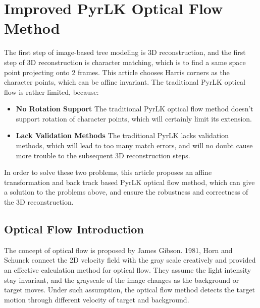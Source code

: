
\chapter{Improved PyrLK Optical Flow Method}
\label{cha:pyrlk}
The first step of image-based tree modeling is 3D reconstruction, and the first
step of 3D reconstruction is character matching, which is to find a same space 
point projecting onto 2 frames. This article chooses Harris corners as the character
points, which can be affine invariant. The traditional PyrLK optical flow is rather 
limited, because:\\

\begin{itemize}
	\item \textbf{No Rotation Support} The traditional PyrLK optical flow method doesn't support
		rotation of character points, which will certainly limit its extension.
	\item \textbf{Lack Validation Methods} The traditional PyrLK lacks validation methods, which will
		lead to too many match errors, and will no doubt cause more trouble to the subsequent 3D 
		reconstruction steps.
\end{itemize}

In order to solve these two problems, this article proposes an affine transformation and back track based
PyrLK optical flow method, which can give a solution to the problems above, and ensure the robustness and 
correctness of the 3D reconstruction.

%

\section{Optical Flow Introduction}
The concept of optical flow is proposed by James Gibson. 1981, Horn and Schunck connect the 
2D velocity field with the gray scale creatively and provided an effective calculation method
for optical flow\cite{horn}. They assume the light intensity stay invariant, and the grayscale
of the image changes as the background or target moves. Under such assumption, the optical flow
method detects the target motion through different velocity of target and background.

